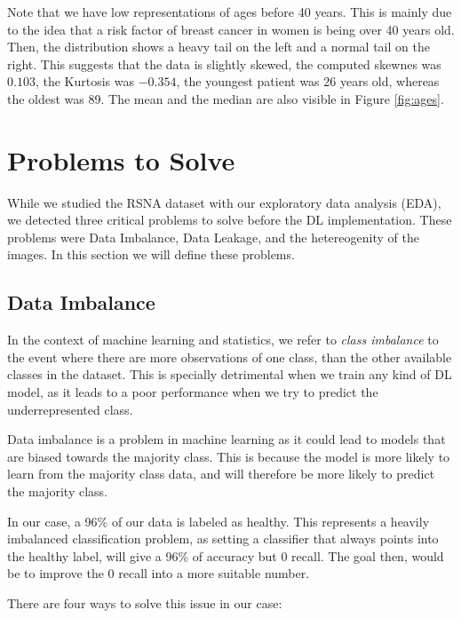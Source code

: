 \documentclass[conference]{IEEEtran}
\begin{document}
Note that we have low representations of ages before 40 years. This is mainly due to the idea that a risk factor of breast cancer in women is being over 40 years old. Then, the distribution shows a heavy tail on the left and a normal tail on the right. This suggests that the data is slightly skewed, the computed skewnes was $0.103$, the Kurtosis was $-0.354$, the youngest patient was 26 years old, whereas the oldest was 89. The mean and the median are also visible in Figure \ref{fig:ages}. 

\section{Problems to Solve}

While we studied the RSNA dataset with our exploratory data analysis (EDA), we detected three critical problems to solve before the DL implementation. These problems were Data Imbalance, Data Leakage, and the hetereogenity of the images. In this section we will define these problems. 

\subsection{Data Imbalance}

In the context of machine learning and statistics, we refer to \textit{class imbalance} to the event where there are more observations of one class, than the other available classes in the dataset. This is specially detrimental when we train any kind of DL model, as it leads to a poor performance when we try to predict the underrepresented class\cite{Marrocco2020}. 

Data imbalance is a problem in machine learning as it could lead to models that are biased towards the majority class. This is because the model is more likely to learn from the majority class data, and will therefore be more likely to predict the majority class.

In our case, a 96\% of our data is labeled as healthy. This represents a heavily imbalanced classification problem, as setting a classifier that always points into the healthy label, will give a 96\% of accuracy but 0 recall. The goal then, would be to improve the 0 recall into a more suitable number. 

There are four ways to solve this issue in our case: 
\end{document}
